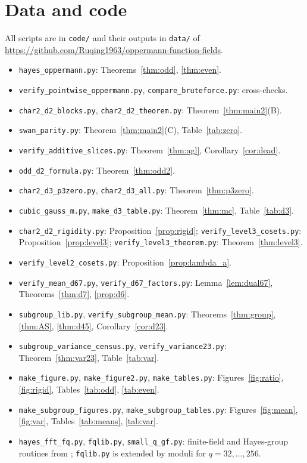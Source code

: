 \documentclass[11pt,a4paper]{amsart}
\theoremstyle{definition}
\theoremstyle{remark}
\begin{document}
\section*{Data and code}
All scripts are in \texttt{code/} and their outputs in \texttt{data/} of
\url{https://github.com/Ruqing1963/oppermann-function-fields}.
\begin{itemize}
\item \texttt{hayes\_oppermann.py}: Theorems~\ref{thm:odd}, \ref{thm:even}.
\item \texttt{verify\_pointwise\_oppermann.py}, \texttt{compare\_bruteforce.py}: cross-checks.
\item \texttt{char2\_d2\_blocks.py}, \texttt{char2\_d2\_theorem.py}: Theorem~\ref{thm:main2}(B).
\item \texttt{swan\_parity.py}: Theorem~\ref{thm:main2}(C), Table~\ref{tab:zero}.
\item \texttt{verify\_additive\_slices.py}: Theorem~\ref{thm:agl}, Corollary~\ref{cor:dead}.
\item \texttt{odd\_d2\_formula.py}: Theorem~\ref{thm:odd2}.
\item \texttt{char2\_d3\_p3zero.py}, \texttt{char2\_d3\_all.py}: Theorem~\ref{thm:p3zero}.
\item \texttt{cubic\_gauss\_m.py}, \texttt{make\_d3\_table.py}: Theorem~\ref{thm:mc}, Table~\ref{tab:d3}.
\item \texttt{char2\_d2\_rigidity.py}: Proposition~\ref{prop:rigid}; \texttt{verify\_level3\_cosets.py}:
Proposition~\ref{prop:level3}; \texttt{verify\_level3\_theorem.py}: Theorem~\ref{thm:level3}.
\item \texttt{verify\_level2\_cosets.py}: Proposition~\ref{prop:lambda_a}.
\item \texttt{verify\_mean\_d67.py}, \texttt{verify\_d67\_factors.py}: Lemma~\ref{lem:dual67},
Theorems~\ref{thm:d7}, \ref{prop:d6}.
\item \texttt{subgroup\_lib.py}, \texttt{verify\_subgroup\_mean.py}: Theorems~\ref{thm:group}, \ref{thm:AS},
\ref{thm:d45}, Corollary~\ref{cor:d23}.
\item \texttt{subgroup\_variance\_census.py}, \texttt{verify\_variance23.py}: Theorem~\ref{thm:var23},
Table~\ref{tab:var}.
\item \texttt{make\_figure.py}, \texttt{make\_figure2.py}, \texttt{make\_tables.py}: Figures~\ref{fig:ratio},
\ref{fig:rigid}, Tables~\ref{tab:odd}, \ref{tab:even}.
\item \texttt{make\_subgroup\_figures.py}, \texttt{make\_subgroup\_tables.py}: Figures~\ref{fig:mean}, \ref{fig:var},
Tables~\ref{tab:means}, \ref{tab:var}.
\item \texttt{hayes\_fft\_fq.py}, \texttt{fqlib.py}, \texttt{small\_q\_gf.py}: finite-field and Hayes-group routines
from \cite{ChenI}; \texttt{fqlib.py} is extended by moduli for $q=32,\dots,256$.
\end{itemize}
\end{document}
